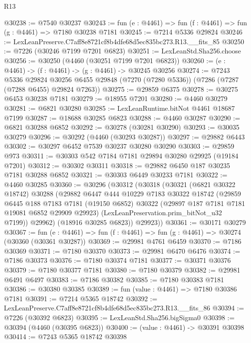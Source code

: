\begin{lexlean}{R13}
\begin{coremodule}
@30238 := @7540 @30237
@30243 := fun (e : @4461) => fun (f : @4461) => fun (g : @4461) => @7180 @30238 @7181
@30245 := @7214 @5336 @29824
@30246 := LexLeanPreserve.C7aff8e8721cf8b4dfe68d5ec835bc273.R13.__fits_85
@30250 := @7226 (@30246 @7199 @7201 @6823)
@30251 := LexLeanStd.Sha256.choose
@30256 := @30250 (@4460 (@30251 @7199 @7201 @6823))
@30260 := (e : @4461) -> (f : @4461) -> (g : @4461) -> @30245 @30256
@30274 := @7243
    @5336
    @29824
    @30256
    @6455
    @29848
    (@7270 (@7280 @5336))
    (@7286 (@7287 (@7288 @6455) @29824 @7263))
@30275 := @29859 @6375
@30278 := @30275 @6453 @30238 @7181
@30279 := @18955 @7201
@30280 := @4460 @30279
@30281 := @6821 @30280
@30285 := LexLeanRuntime.bitNot @4461 @18687 @7199
@30287 := @18688 @30285 @6823
@30288 := @4460 @30287
@30290 := @6821 @30288 @6852
@30292 := @30278 (@30281 @30290)
@30293 := @30035 @30279
@30296 := @30292 (@4460 (@30293 @30287))
@30297 := @29882 @6443
@30302 := @30297 @6452 @7539 @30237 @30280 @30290
@30303 := @29859 @973
@30311 := @30303 @542 @7184 @7181 @29894 @30280 @29925 (@19184 @7201)
@30312 := @30302 @30311
@30318 := @29882 @6450 @187 @30235 @7181 @30288 @6852
@30321 := @30303 @6449 @30233 @7181
@30322 := @4460 @30285
@30360 := @30296
    (@30312
      (@30318
        (@30321
          (@6821 @30322 @18742)
          @30288
          (@29882
            @6447
            @444
            @10229
            @7183
            @30322
            @18742
            (@29859
              @6445
              @188
              @7183
              @7181
              (@19150 @6852)
              @30322
              (@29897 @187 @7181 @7181 @19081 @6852 @29909 @29923)
              (LexLeanPreservation.prim_bitNot_u32 @7199))
            @29962)
          (@18916 @30285 @6823))
        @29923))
@30361 := @30171 @30279
@30367 := fun (e : @4461) => fun (f : @4461) => fun (g : @4461) => @30274 (@30360 (@30361 @30287))
@30369 := @29981 @4761 @6459
@30370 := @7186 @30369
@30371 := @7180 @30370
@30373 := @29981 @6470 @6476
@30374 := @7186 @30373
@30376 := @7180 @30374 @7181
@30377 := @30371 @30376
@30379 := @7180 @30377 @7181
@30380 := @7180 @30379
@30382 := @29981 @6491 @6497
@30383 := @7186 @30382
@30385 := @7180 @30383 @7181
@30386 := @30380 @30385
@30389 := fun (value : @4461) => @7180 @30386 @7181
@30391 := @7214 @5365 @18742
@30392 := LexLeanPreserve.C7aff8e8721cf8b4dfe68d5ec835bc273.R13.__fits_86
@30394 := @7226 (@30392 @6823)
@30395 := LexLeanStd.Sha256.bigSigma0
@30398 := @30394 (@4460 (@30395 @6823))
@30400 := (value : @4461) -> @30391 @30398
@30414 := @7243
    @5365
    @18742
    @30398

\end{coremodule}
\end{lexlean}
